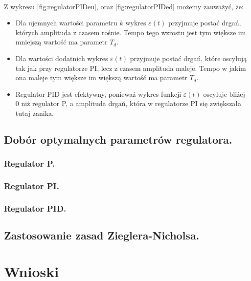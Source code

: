 \documentclass[a4paper,10pt]{article}
\begin{document}
\\ Z wykresu \ref{fig:regulatorPIDeu}, oraz \ref{fig:regulatorPIDed} możemy zauważyć, że:
\begin{itemize}
	\item Dla ujemnych wartości parametru $k$ wykres $\varepsilon(t)$ przyjmuje postać drgań, których amplituda z czasem rośnie. Tempo tego wzrostu jest tym większe im mniejszą wartość ma parametr $T_{d}$.
	\item Dla wartości dodatnich wykres $\varepsilon(t)$ przyjmuje postać drgań, które oscylują tak jak przy regulatorze PI, lecz z czasem amplituda maleje. Tempo w jakim ona maleje tym większe im większą wartość ma parametr $T_{d}$.
	\item Regulator PID jest efektywny, ponieważ wykres funkcji $\varepsilon(t)$ oscyluje bliżej 0 niż regulator P, a amplituda drgań, która w regulatorze PI się zwiększała tutaj zanika.
\end{itemize}

\subsection{Dobór optymalnych parametrów regulatora.}\label{sec:zad2}
\subsubsection{Regulator P.}
\subsubsection{Regulator PI.}
\subsubsection{Regulator PID.}
\subsection{Zastosowanie zasad Zieglera-Nicholsa.}\label{sec:zad3}

\section{Wnioski}
\end{document}
